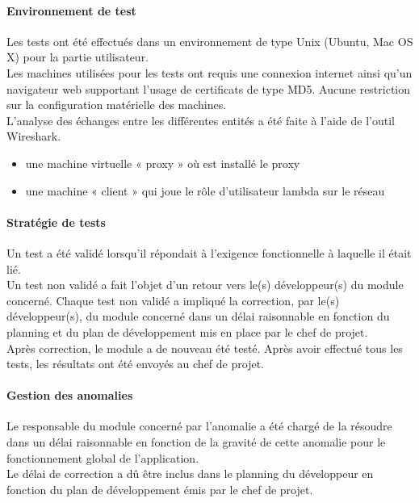 \paragraph{Environnement de test}
Les tests ont été effectués dans un environnement de type Unix (Ubuntu, Mac OS 
X) pour la partie utilisateur.~~\\

Les machines utilisées pour les tests ont requis une connexion internet ainsi qu'un
navigateur web supportant l'usage de certificats de type MD5. Aucune restriction sur la configuration matérielle des machines.~~\\

L'analyse des échanges entre les différentes entités a été faite à l'aide de l'outil Wireshark.
\begin{itemize}
\item une machine virtuelle « proxy » où est installé le proxy 
\item une machine « client » qui joue le rôle d'utilisateur lambda sur le réseau
\end{itemize}

\paragraph{Stratégie de tests}
Un test a été validé lorsqu’il répondait à l’exigence fonctionnelle à laquelle il était lié.~~\\

Un test non validé a fait l’objet d’un retour vers le(s) développeur(s) du module concerné.
Chaque test non validé a impliqué la correction, par le(s) développeur(s), du module concerné dans
un délai raisonnable en fonction du planning et du plan de développement mis en place par le chef de
projet.~~\\

Après correction, le module a de nouveau été testé. Après avoir effectué tous les tests, les
résultats ont été envoyés au chef de projet.

\paragraph{Gestion des anomalies}
Le responsable du module concerné par l’anomalie a été chargé de la résoudre dans un délai raisonnable en fonction de la gravité de cette anomalie pour le fonctionnement global
  de l’application. ~~\\
    
  Le délai de correction a dû être inclus dans le planning du développeur en fonction
  du plan de développement émis par le chef de projet.
  
